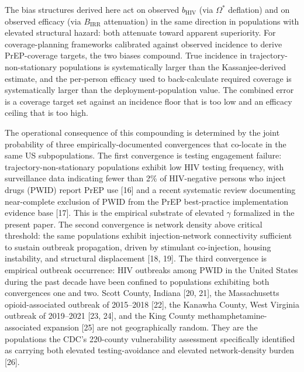 \documentclass[12pt]{article}
\begin{document}
The bias structures derived here act on observed $b_{\mathrm{HIV}}$ (via $\Omega^*$ deflation) and on observed efficacy (via $B_{\mathrm{IRR}}$ attenuation) in the same direction in populations with elevated structural hazard: both attenuate toward apparent superiority. For coverage-planning frameworks calibrated against observed incidence to derive PrEP-coverage targets, the two biases compound. True incidence in trajectory-non-stationary populations is systematically larger than the Kassanjee-derived estimate, and the per-person efficacy used to back-calculate required coverage is systematically larger than the deployment-population value. The combined error is a coverage target set against an incidence floor that is too low and an efficacy ceiling that is too high.

The operational consequence of this compounding is determined by the joint probability of three empirically-documented convergences that co-locate in the same US subpopulations. The first convergence is testing engagement failure: trajectory-non-stationary populations exhibit low HIV testing frequency, with surveillance data indicating fewer than 2\% of HIV-negative persons who inject drugs (PWID) report PrEP use [16] and a recent systematic review documenting near-complete exclusion of PWID from the PrEP best-practice implementation evidence base [17]. This is the empirical substrate of elevated $\gamma$ formalized in the present paper. The second convergence is network density above critical threshold: the same populations exhibit injection-network connectivity sufficient to sustain outbreak propagation, driven by stimulant co-injection, housing instability, and structural displacement [18, 19]. The third convergence is empirical outbreak occurrence: HIV outbreaks among PWID in the United States during the past decade have been confined to populations exhibiting both convergences one and two. Scott County, Indiana [20, 21], the Massachusetts opioid-associated outbreak of 2015--2018 [22], the Kanawha County, West Virginia outbreak of 2019--2021 [23, 24], and the King County methamphetamine-associated expansion [25] are not geographically random. They are the populations the CDC's 220-county vulnerability assessment specifically identified as carrying both elevated testing-avoidance and elevated network-density burden [26].
\end{document}
